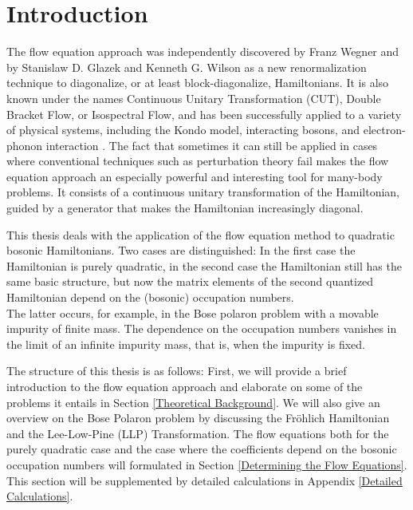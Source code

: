 \chapter{Introduction}
The flow equation approach was independently discovered by Franz Wegner \cite{https://doi.org/10.1002/andp.19945060203} and by Stanislaw D. Glazek and Kenneth G. Wilson \cite{PhysRevD.48.5863} as a new renormalization technique to diagonalize, or at least block-diagonalize, Hamiltonians. It is also known under the names Continuous Unitary Transformation (CUT), Double Bracket Flow, or Isospectral Flow, and has been successfully applied to a variety of physical systems, including the Kondo model, interacting bosons, and electron-phonon interaction \cite{Wegner_2006}. The fact that sometimes it can still be applied in cases where conventional techniques such as perturbation theory fail makes the flow equation approach an especially powerful and interesting tool for many-body problems.  It consists of a continuous unitary transformation of the Hamiltonian, guided by a generator that makes the Hamiltonian increasingly diagonal. \par
This thesis deals with the application of the flow equation method to quadratic bosonic Hamiltonians. Two cases are distinguished: In the first case the Hamiltonian is purely quadratic, in the second case the Hamiltonian still has the same basic structure, but now the matrix elements of the second quantized Hamiltonian depend on the (bosonic) occupation numbers.\\
The latter occurs, for example, in the Bose polaron problem with a movable impurity of finite mass. The dependence on the occupation numbers vanishes in the limit of an infinite impurity mass, that is, when the impurity is fixed.\par
The structure of this thesis is as follows: First, we will provide a brief introduction to the flow equation approach and elaborate on some of the problems it entails in Section \ref{Theoretical Background}. We will also give an overview on the Bose Polaron problem by discussing the Fröhlich Hamiltonian and the Lee-Low-Pine (LLP) Transformation. The flow equations  both for the purely quadratic case and the case where the coefficients depend on the bosonic occupation numbers will formulated in Section \ref{Determining the Flow Equations}. This section will be supplemented by detailed calculations in Appendix \ref{Detailed Calculations}.\\
